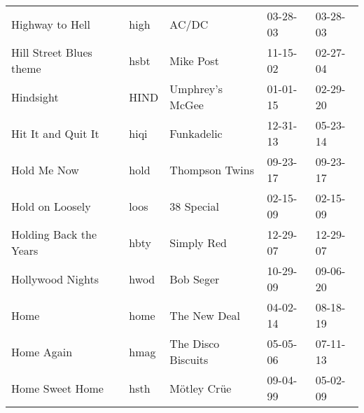 \begin{longtable}{p{}p{}p{}p{}p{}}
                                                         Highway to Hell &          high &                                                    AC/DC &              03-28-03 &             03-28-03 \\
                                                 Hill Street Blues theme &          hsbt &                                                Mike Post &              11-15-02 &             02-27-04 \\
                                                               Hindsight &          HIND &                                          Umphrey's McGee &              01-01-15 &             02-29-20 \\
                                                      Hit It and Quit It &          hiqi &                                               Funkadelic &              12-31-13 &             05-23-14 \\
                                                             Hold Me Now &          hold &                                           Thompson Twins &              09-23-17 &             09-23-17 \\
                                                         Hold on Loosely &          loos &                                               38 Special &              02-15-09 &             02-15-09 \\
                                                  Holding Back the Years &          hbty &                                               Simply Red &              12-29-07 &             12-29-07 \\
                                                        Hollywood Nights &          hwod &                                                Bob Seger &              10-29-09 &             09-06-20 \\
                                                                    Home &          home &                                             The New Deal &              04-02-14 &             08-18-19 \\
                                                              Home Again &          hmag &                                       The Disco Biscuits &              05-05-06 &             07-11-13 \\
                                                         Home Sweet Home &          hsth &                                              Mötley Crüe &              09-04-99 &             05-02-09 \\

\end{longtable}
